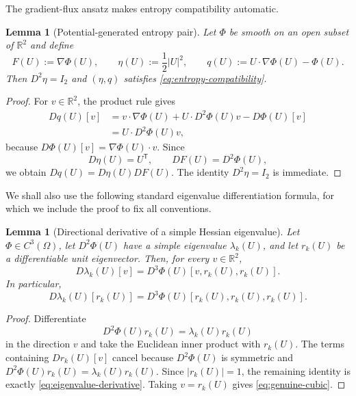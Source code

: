 \documentclass[11pt,reqno]{amsart}
\newtheorem{lemma}[theorem]{Lemma}
\theoremstyle{definition}
\newcommand{\R}{\mathbb{R}}
\newcommand{\trans}{\mathsf{T}}
\newcommand{\abs}[1]{\lvert#1\rvert}
\begin{document}
The gradient-flux ansatz makes entropy compatibility automatic.

\begin{lemma}[Potential-generated entropy pair]
  \label{lem:potential-entropy}
Let $\Phi$ be smooth on an open subset of $\R^2$ and define
\begin{equation}
  F(U):=\nabla\Phi(U),
  \qquad
  \eta(U):=\frac12\abs{U}^2,
  \qquad
  q(U):=U\cdot\nabla\Phi(U)-\Phi(U).
  \label{eq:potential-ansatz}
\end{equation}
Then $D^2\eta=I_2$ and $(\eta,q)$ satisfies
\cref{eq:entropy-compatibility}.
\end{lemma}

\begin{proof}
For $v\in\R^2$, the product rule gives
\begin{align}
  Dq(U)[v]
  &=v\cdot\nabla\Phi(U)
    +U\cdot D^2\Phi(U)v-D\Phi(U)[v]\\
  &=U\cdot D^2\Phi(U)v,
\end{align}
because $D\Phi(U)[v]=\nabla\Phi(U)\cdot v$.  Since
\begin{equation}
  D\eta(U)=U^{\trans},
  \qquad
  DF(U)=D^2\Phi(U),
\end{equation}
we obtain $Dq(U)=D\eta(U)DF(U)$.  The identity
$D^2\eta=I_2$ is immediate.
\end{proof}

We shall also use the following standard eigenvalue differentiation formula,
for which we include the proof to fix all conventions.

\begin{lemma}[Directional derivative of a simple Hessian eigenvalue]
  \label{lem:eigenvalue-derivative}
Let $\Phi\in C^3(\Omega)$, let $D^2\Phi(U)$ have a simple eigenvalue
$\lambda_k(U)$, and let $r_k(U)$ be a differentiable unit eigenvector.  Then,
for every $v\in\R^2$,
\begin{equation}
  D\lambda_k(U)[v]
  =D^3\Phi(U)[v,r_k(U),r_k(U)].
  \label{eq:eigenvalue-derivative}
\end{equation}
In particular,
\begin{equation}
  D\lambda_k(U)[r_k(U)]
  =D^3\Phi(U)[r_k(U),r_k(U),r_k(U)].
  \label{eq:genuine-cubic}
\end{equation}
\end{lemma}

\begin{proof}
Differentiate
\begin{equation}
  D^2\Phi(U)r_k(U)=\lambda_k(U)r_k(U)
\end{equation}
in the direction $v$ and take the Euclidean inner product with $r_k(U)$.
The terms containing $Dr_k(U)[v]$ cancel because $D^2\Phi(U)$ is symmetric
and $D^2\Phi(U)r_k(U)=\lambda_k(U)r_k(U)$.  Since $\abs{r_k(U)}=1$, the
remaining identity is exactly \cref{eq:eigenvalue-derivative}.  Taking
$v=r_k(U)$ gives \cref{eq:genuine-cubic}.
\end{proof}
\end{document}
